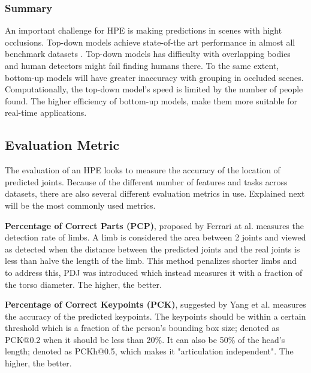 \subsubsection{Summary}
An important challenge for \gls{HPE} is making predictions in scenes with hight occlusions.
Top-down models achieve state-of-the art performance in almost all benchmark datasets \cite{Chen2000}.
Top-down models has difficulty with overlapping bodies and human detectors might fail finding humans there.
To the same extent, bottom-up models will have greater inaccuracy with grouping in occluded scenes.
Computationally, the top-down model's speed is limited by the number of people found.
The higher efficiency of bottom-up models, make them more suitable for real-time applications.

\subsection{Evaluation Metric}
The evaluation of an \gls{HPE} looks to measure the accuracy of the location of predicted joints.
Because of the different number of features and tasks across datasets, there are also several different evaluation metrics in use.
Explained next will be the most commonly used metrics.

\textbf{Percentage of Correct Parts (PCP)}, proposed by Ferrari at al. \cite{Ferrari2008} measures the detection rate of limbs.
A limb is considered the area between 2 joints and viewed as detected when the distance between the predicted joints and the real joints is less than halve the length of the limb.
This method penalizes shorter limbs and to address this, \gls{PDJ} was introduced which instead measures it with a fraction of the torso diameter.
The higher, the better.

\textbf{Percentage of Correct Keypoints (PCK)}, suggested by Yang et al. \cite{Yang2013} measures the accuracy of the predicted keypoints.
The keypoints should be within a certain threshold which is a fraction of the person's bounding box size; denoted as PCK@0.2 when it should be less than 20\%.
It can also be 50\% of the head's length; denoted as PCKh@0.5, which makes it "articulation independent".
The higher, the better.

